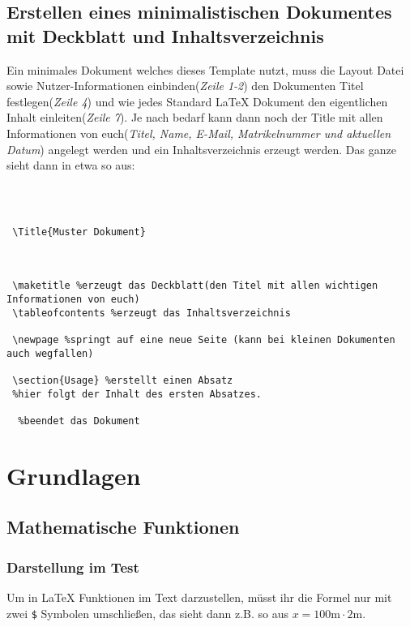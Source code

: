 \subsection{Erstellen eines minimalistischen Dokumentes mit Deckblatt und Inhaltsverzeichnis}
Ein minimales Dokument welches dieses Template nutzt, muss die Layout Datei sowie Nutzer-Informationen einbinden(\textit{Zeile 1-2}) den Dokumenten Titel festlegen(\textit{Zeile 4}) und wie jedes Standard {\LaTeX} Dokument den eigentlichen Inhalt einleiten(\textit{Zeile 7}). Je nach bedarf kann dann noch der Title mit allen Informationen von euch(\textit{Titel, Name, E-Mail, Matrikelnummer und aktuellen Datum}) angelegt werden und ein Inhaltsverzeichnis erzeugt werden. Das ganze sieht dann in etwa so aus:
\pagebreak
\begin{lstlisting}
 
 

 \Title{Muster Dokument}


 
 \maketitle %erzeugt das Deckblatt(den Titel mit allen wichtigen Informationen von euch)
 \tableofcontents %erzeugt das Inhaltsverzeichnis

 \newpage %springt auf eine neue Seite (kann bei kleinen Dokumenten auch wegfallen)

 \section{Usage} %erstellt einen Absatz
 %hier folgt der Inhalt des ersten Absatzes.
 
  %beendet das Dokument
\end{lstlisting}


\section{Grundlagen}
\subsection{Mathematische Funktionen}
\subsubsection{Darstellung im Test}
Um in {\LaTeX} Funktionen im Text darzustellen, müsst ihr die Formel nur mit zwei \texttt{\$} Symbolen umschließen, das sieht dann z.B. so aus $x=100\si{\meter} \cdot 2\si{\meter}$.

